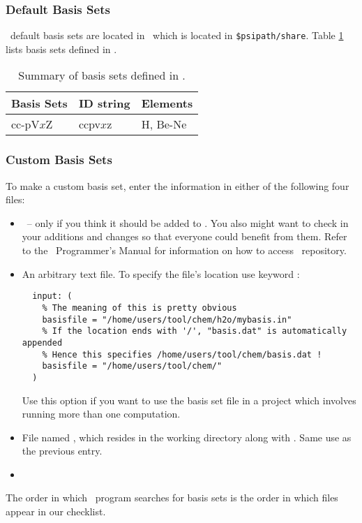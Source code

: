 \subsubsection{Default Basis Sets}
\PSIthree\ default basis sets are located in \pbasisdat\ which is located in
{\tt \$psipath/share}. Table \ref{table:basisset} lists basis sets defined in \pbasisdat.
\begin{table}
\caption{Summary of basis sets defined in \PSIthree.}
\label{table:basisset}
\begin{tabular}{lll} \hline\hline 
Basis Sets & ID string & Elements \\ \hline
cc-pV$x$Z & ccpv$x$z & H, Be-Ne \\
\hline\hline
\end{tabular}
\end{table}

\subsubsection{Custom Basis Sets}
To make a custom basis set, enter the information in either of the following four files:
\begin{itemize}
\item \pbasisdat\ -- only if you think it should be added to \PSIthree. You also
might want to check in your additions and changes so that everyone could
benefit from them. Refer to the \PSIthree\ Programmer's Manual for information
on how to access \PSIthree\ repository.
\item An arbitrary text file. To specify the file's location use keyword
:
\begin{verbatim}
  input: (
    % The meaning of this is pretty obvious
    basisfile = "/home/users/tool/chem/h2o/mybasis.in"
    % If the location ends with '/', "basis.dat" is automatically appended
    % Hence this specifies /home/users/tool/chem/basis.dat !
    basisfile = "/home/users/tool/chem/"
  )
\end{verbatim}
Use this option if you want to use the basis set file in a project
which involves running more than one computation.
\item File named \basisdat, which resides in the working directory along with  .
Same use as the previous entry.
\item {}
\end{itemize}
The order in which \PSIinput\ program searches for basis sets is the order in which files
appear in our checklist.

